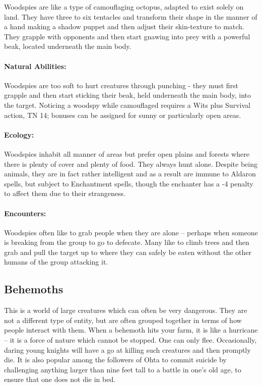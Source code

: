 Woodspies are like a type of camouflaging octopus, adapted to exist solely on land.  They have three to six tentacles and transform their shape in the manner of a hand making a shadow puppet and then adjust their skin-texture to match.  They grapple with opponents and then start gnawing into prey with a powerful beak, located underneath the main body.

\paragraph{Natural Abilities:} Woodspies are too soft to hurt creatures through punching - they must first grapple and then start sticking their beak, held underneath the main body, into the target.  Noticing a woodspy while camouflaged requires a Wits plus Survival action, TN 14; bonuses can be assigned for sunny or particularly open areas.

\paragraph{Ecology:} Woodspies inhabit all manner of areas but prefer open plains and forests where there is plenty of cover and plenty of food.  They always hunt alone.  Despite being animals, they are in fact rather intelligent and as a result are immune to Aldaron spells, but subject to Enchantment spells, though the enchanter has a -4 penalty to affect them due to their strangeness.

\paragraph{Encounters:} Woodspies often like to grab people when they are alone -- perhaps when someone is breaking from the group to go to defecate.  Many like to climb trees and then grab and pull the target up to where they can safely be eaten without the other humans of the group attacking it.

\subsection{Behemoths}

This is a world of large creatures which can often be very dangerous.  They are not a different type of entity, but are often grouped together in terms of how people interact with them.  When a behemoth hits your farm, it is like a hurricane -- it is a force of nature which cannot be stopped.  One can only flee.  Occasionally, daring young knights will have a go at killing such creatures and then promptly die.  It is also popular among the followers of Ohta to commit suicide by challenging anything larger than nine feet tall to a battle in one's old age, to ensure that one does not die in bed.

